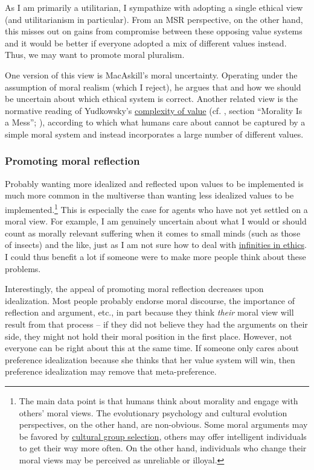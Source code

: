 As I am primarily a utilitarian, I sympathize with adopting a single
ethical view (and utilitarianism in particular). From an MSR
perspective, on the other hand, this misses out on gains from compromise
between these opposing value systems and it would be better if everyone
adopted a mix of different values instead. Thus, we may want to promote
moral pluralism.

One version of this view is MacAskill's \citeyear{MacAskill2014-ca} 
moral uncertainty. Operating under the assumption of moral realism
(which I reject), he argues that and how we should be uncertain about
which ethical system is correct. Another related view is the normative
reading of Yudkowsky's
\href{https://wiki.lesswrong.com/wiki/Complexity_of_value}{complexity
of value} (cf. \citet{Stewart-Williams2015-gg}, section
``Morality Is a Mess''; \cite[chapters 3--5.3]{Muehlhauser2012-ib}),
according to which what humans care about cannot be captured by a simple
moral system and instead incorporates a large number of different
values.

\subsubsection{Promoting moral
reflection}\label{promoting-moral-reflection}

Probably wanting more idealized and reflected upon values to be
implemented is much more common in the multiverse than wanting less
idealized values to be implemented.\footnote{The main data point is that
  humans think about morality and engage with others' moral views. The
  evolutionary psychology and cultural evolution perspectives, on the
  other hand, are non-obvious. Some moral arguments may be favored by
  \href{https://en.wikipedia.org/wiki/Cultural_group_selection}{cultural
  group selection}, others may offer intelligent individuals to get
  their way more often. On the other hand, individuals who change their
  moral views may be perceived as unreliable or illoyal.} This is
especially the case for agents who have not yet settled on a moral view.
For example, I am genuinely uncertain about what I would or should count
as morally relevant suffering when it comes to small minds (such as
those of insects) and the like, just as I am not sure how to deal with
\href{https://foundational-research.org/infinity-in-ethics/}{infinities
in ethics}. I could thus benefit a lot if someone were to make more
people think about these problems.

Interestingly, the appeal of promoting moral reflection decreases upon
idealization. Most people probably endorse moral discourse, the
importance of reflection and argument, etc., in part because they think
\emph{their} moral view will result from that process -- if they did not
believe they had the arguments on their side, they might not hold their
moral position in the first place. However, not everyone can be right
about this at the same time. If someone only cares about preference
idealization because she thinks that her value system will win, then
preference idealization may remove that meta-preference.

